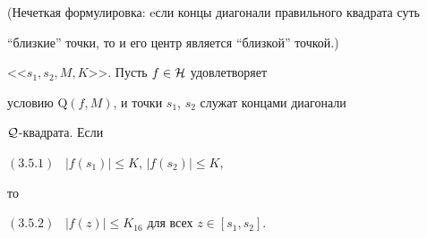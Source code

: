 (Нечеткая формулировка: eсли концы диагонали правильного квадрата суть 


``близкие'' точки, то и его центр является ``близкой'' точкой.)





\begin{lems}


<<$s_1, s_2, M, K$>>. Пусть $f\in {\cal H}$ удовлетворяет 


условию $\mathrm Q(f,M)$, и точки $s_1$, $s_2$ служат концами диагонали 


${\cal Q}$-квадрата. Если





$(3.5.1)$ \ $|f(s_1)| \leq K$, $|f(s_2)| \leq K$,





\noindent{}то





$(3.5.2)$ \ $|f(z)| \leq K_{16}$ для всех $z\in [s_1, s_2]$.


\end{lems}





